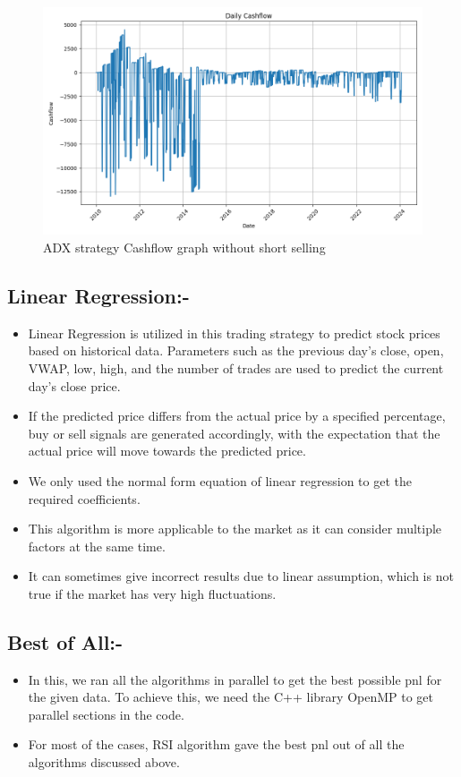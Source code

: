 \documentclass[11pt]{article}
\begin{document}
\begin{figure}[H]
  \centering
  \includegraphics[width=1\textwidth]{ADX_without_short.png}
  \caption{ADX strategy Cashflow graph without short selling}
\end{figure}

\subsection{Linear Regression:-}
\begin{itemize}
    \item Linear Regression is utilized in this trading strategy to predict stock prices based on historical data. Parameters such as the previous day's close, open, VWAP, low, high, and the number of trades are used to predict the current day's close price. 
    \item If the predicted price differs from the actual price by a specified percentage, buy or sell signals are generated accordingly, with the expectation that the actual price will move towards the predicted price.
    \item We only used the normal form equation of linear regression to get the required coefficients.
    \item This algorithm is more applicable to the market as it can consider multiple factors at the same time.
    \item It can sometimes give incorrect results due to linear assumption, which is not true if the market has very high fluctuations.
\end{itemize}

\subsection{Best of All:-}
\begin{itemize}
    \item In this, we ran all the algorithms in parallel to get the best possible pnl for the given data. To achieve this, we need the C++ library OpenMP to get parallel sections in the code.
    \item For most of the cases, RSI algorithm gave the best pnl out of all the algorithms discussed above.
\end{itemize}
\end{document}
